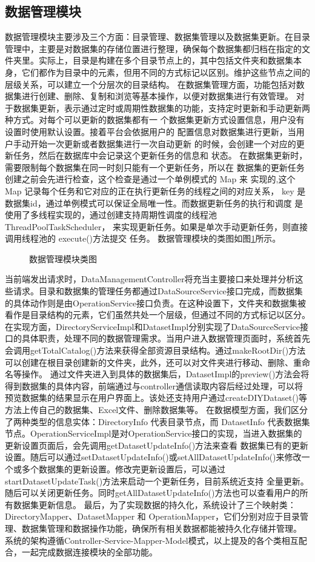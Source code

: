 \subsection{数据管理模块}
数据管理模块主要涉及三个方面：目录管理、数据集管理以及数据集更新。在目录管理中，主要是对数据集的存储位置进行整理，确保每个数据集都归档在指定的文件夹里。实际上，目录是构建在多个目录节点上的，其中包括文件夹和数据集本身，它们都作为目录中的元素，但用不同的方式标记以区别。维护这些节点之间的层级关系，可以建立一个分层次的目录结构。
在数据集管理方面，功能包括对数据集进行创建、删除、复制和浏览等基本操作，以便对数据集进行有效管理。
对于数据集更新，表示通过定时或周期性数据集的功能，支持定时更新和手动更新两种方式。对每个可以更新的数据集都有一
个数据集更新方式设置信息，用户没有设置时使用默认设置。接着平台会依据用户的
配置信息对数据集进行更新，当用户手动开始一次更新或者数据集进行一次自动更新
的时候，会创建一个对应的更新任务，然后在数据库中会记录这个更新任务的信息和
状态。
在数据集更新时，需要限制每个数据集在同一时刻只能有一个更新任务，所以在
数据集的更新任务创建之前会先进行检查，这个检查是通过一个单例模式的 Map 来
实现的,这个 Map 记录每个任务和它对应的正在执行更新任务的线程之间的对应关系，
key 是数据集id，通过单例模式可以保证全局唯一性。而数据更新任务的执行和调度
是使用了多线程实现的，通过创建支持周期性调度的线程池ThreadPoolTaskScheduler，
来实现更新任务。如果是单次手动更新任务，则直接调用线程池的 execute()方法提交
任务。
数据管理模块的类图如图\ref{fig:datamanageclass}所示。
\begin{figure}[H]
    \centering
    \caption{数据管理模块类图}
    \label{fig:datamanageclass}
\end{figure}
当前端发出请求时，DataManagementController将充当主要接口来处理并分析这些请求。目录和数据集的管理任务都通过DataSourceService接口完成，而数据集的具体动作则是由OperationService接口负责。在这种设置下，文件夹和数据集被看作是目录结构的元素，它们虽然共处一个层级，但通过不同的方式标记以区分。
在实现方面，DirectoryServiceImpl和DatasetImpl分别实现了DataSourceService接口的具体职责，处理不同的数据管理需求。当用户进入数据管理页面时，系统首先会调用getTotalCatalog()方法来获得全部资源目录结构。通过makeRootDir()方法可以创建在根目录创建新的文件夹，此外，还可以对文件夹进行移动、删除、重命名等操作。
通过文件夹进入到具体的数据集后，DatasetImpl的preview()方法会将得到数据集的具体内容，前端通过与controller通信读取内容后经过处理，可以将预览数据集的结果显示在用户界面上。该处还支持用户通过createDIYDataset()等方法上传自己的数据集、Excel文件、删除数据集等。
在数据模型方面，我们区分了两种类型的信息实体：DirectoryInfo 代表目录节点，而 DatasetInfo 代表数据集节点。OperationServiceImpl是对OperationService接口的实现，当进入数据集的更新设置页面后，会先调用getDatasetUpdateInfo()方法来查看
数据集已有的更新设置。随后可以通过setDatasetUpdateInfo()或setAllDatasetUpdateInfo()来修改一个或多个数据集的更新设置。修改完更新设置后，可以通过startDatasetUpdateTask()方法来启动一个更新任务，目前系统近支持
全量更新。随后可以关闭更新任务。同时getAllDatasetUpdateInfo()方法也可以查看用户的所有数据集更新信息。
最后，为了实现数据的持久化，系统设计了三个映射类：DirectoryMapper、DatasetMapper 和 OperationMapper，它们分别对应于目录管理、数据集管理和数据操作功能，确保所有相关数据都能被持久化存储并管理。
系统的架构遵循Controller-Service-Mapper-Model模式，以上提及的各个类相互配合，一起完成数据连接模块的全部功能。
